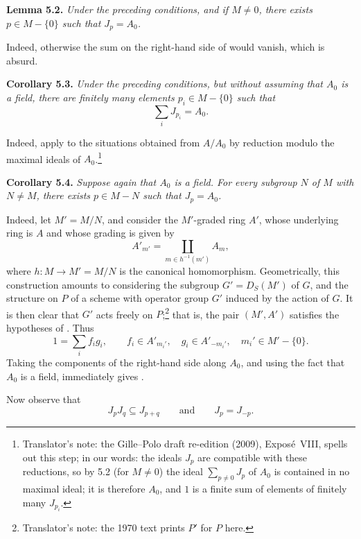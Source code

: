 \medskip
\noindent{}\textbf{Lemma 5.2.}
\textit{Under the preceding conditions, and if \(M\ne0\), there exists
\(p\in M-\{0\}\) such that \(J_p=A_0\).}

Indeed, otherwise the sum on the right-hand side of
 would vanish, which is
absurd.

\medskip
\noindent{}\textbf{Corollary 5.3.}
\textit{Under the preceding conditions, but without assuming that
\(A_0\) is a field, there are finitely many elements
\(p_i\in M-\{0\}\) such that}
\[
  \sum_iJ_{p_i}=A_0.
\]

Indeed, apply  to the situations
obtained from \(A/A_0\) by reduction modulo the maximal ideals of
\(A_0\).\footnote{Translator's note: the Gille--Polo draft re-edition (2009), Expos\'e~VIII, spells
out this step; in our words: the ideals \(J_p\) are compatible with these reductions, so by 5.2
(for \(M\ne0\)) the ideal \(\sum_{p\ne0}J_p\) of \(A_0\) is contained in no maximal ideal; it is
therefore \(A_0\), and \(1\) is a finite sum of elements of finitely many \(J_{p_i}\).}

\medskip
\noindent{}\textbf{Corollary 5.4.}
\textit{Suppose again that \(A_0\) is a field. For every subgroup
\(N\) of \(M\) with \(N\ne M\), there exists \(p\in M-N\) such that
\(J_p=A_0\).}

Indeed, let \(M'=M/N\), and consider the \(M'\)-graded ring \(A'\), whose
underlying ring is \(A\) and whose grading is given by
\[
  A'_{m'}=\coprod_{m\in h^{-1}(m')}A_m,
\]
where \(h:M\to M'=M/N\) is the canonical homomorphism. Geometrically,
this construction amounts to considering the subgroup
\(G'=D_S(M')\) of \(G\), and the structure on \(P\) of a scheme with
operator group \(G'\) induced by the action of \(G\). It is then clear
that \(G'\) acts freely on \(P\);\footnote{Translator's note: the 1970 text
prints \(P'\) for \(P\) here.} that is, the pair \((M',A')\)
satisfies the hypotheses of .
Thus
\[
  1=\sum_i f_i g_i,
  \qquad
  f_i\in A'_{m_i'},\quad
  g_i\in A'_{-m_i'},\quad
  m_i'\in M'-\{0\}.
\]
Taking the components of the right-hand side along \(A_0\), and using
the fact that \(A_0\) is a field, immediately gives
.

Now observe that
\[
  J_pJ_q\subseteq J_{p+q}
  \qquad\text{and}\qquad
  J_p=J_{-p}.
\]

